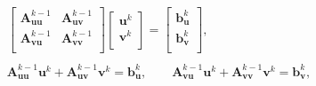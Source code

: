
\begin{align*}
\begin{matrix}
  \left[ \begin{matrix}
   \mathbf{A}_{\mathbf{uu}}^{k-1} & \mathbf{A}_{\mathbf{uv}}^{k-1}  \\
   \mathbf{A}_{\mathbf{vu}}^{k-1} & \mathbf{A}_{\mathbf{vv}}^{k-1}  \\
\end{matrix} \right]\left[ \begin{matrix}
   \mathbf{u}^{k}  \\
   \mathbf{v}^{k}  \\
\end{matrix} \right]=\left[ \begin{matrix}
   \mathbf{b}_{\mathbf{u}}^{k}  \\
   \mathbf{b}_{\mathbf{v}}^{k}  \\
\end{matrix} \right], \\ 
   \\ 
  \mathbf{A}_{\mathbf{uu}}^{k-1}\mathbf{u}^{k} + \mathbf{A}_{\mathbf{uv}}^{k-1}\mathbf{v}^{k} =\mathbf{b}_{\mathbf{u}}^{k},
  \quad \quad \mathbf{A}_{\mathbf{vu}}^{k-1}\mathbf{u}^{k} + \mathbf{A}_{\mathbf{vv}}^{k-1}\mathbf{v}^{k} =\mathbf{b}_{\mathbf{v}}^{k}, \\ 
\end{matrix}
\end{align*}

